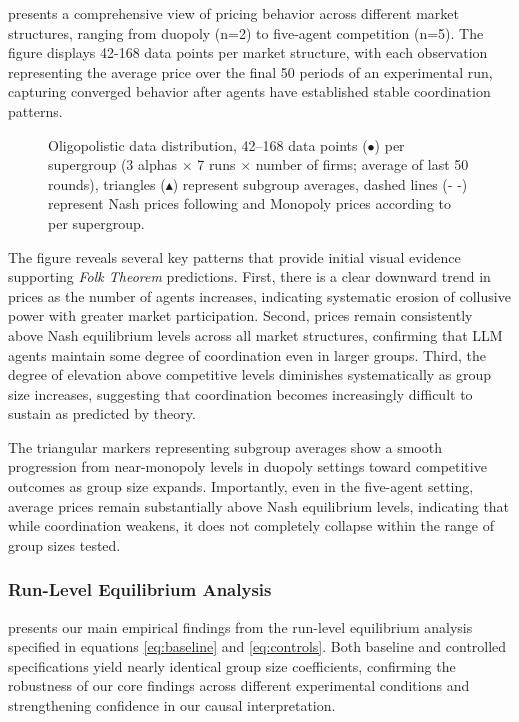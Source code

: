  presents a comprehensive view of pricing behavior across different market structures, ranging from duopoly (n=2) to five-agent competition (n=5). The figure displays 42-168 data points per market structure, with each observation representing the average price over the final 50 periods of an experimental run, capturing converged behavior after agents have established stable coordination patterns.

\begin{figure}[htpb!]
    \centering
    
    \caption{Oligopolistic data distribution, 42--168 data points ($\bullet$) per supergroup (3 alphas $\times$ 7 runs $\times$ number of firms; average of last 50 rounds), triangles ($\blacktriangle$) represent subgroup averages, dashed lines ($\text{- -}$) represent Nash prices following  and Monopoly prices according to  per supergroup.}
    \label{fig:oligopols}
\end{figure}

The figure reveals several key patterns that provide initial visual evidence supporting \emph{Folk Theorem} predictions. First, there is a clear downward trend in prices as the number of agents increases, indicating systematic erosion of collusive power with greater market participation. Second, prices remain consistently above Nash equilibrium levels across all market structures, confirming that LLM agents maintain some degree of coordination even in larger groups. Third, the degree of elevation above competitive levels diminishes systematically as group size increases, suggesting that coordination becomes increasingly difficult to sustain as predicted by theory.

The triangular markers representing subgroup averages show a smooth progression from near-monopoly levels in duopoly settings toward competitive outcomes as group size expands. Importantly, even in the five-agent setting, average prices remain substantially above Nash equilibrium levels, indicating that while coordination weakens, it does not completely collapse within the range of group sizes tested.

\subsubsection*{Run-Level Equilibrium Analysis}

 presents our main empirical findings from the run-level equilibrium analysis specified in equations \ref{eq:baseline} and \ref{eq:controls}. Both baseline and controlled specifications yield nearly identical group size coefficients, confirming the robustness of our core findings across different experimental conditions and strengthening confidence in our causal interpretation.

